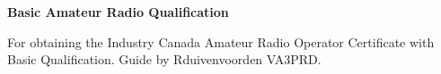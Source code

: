 \documentclass[12pt,letterpaper,fleqn,oneside]{article}
\begin{document}
\LARGE{\textbf{Basic Amateur Radio Qualification}}

\normalsize For obtaining the Industry Canada Amateur Radio Operator Certificate with Basic Qualification. Guide by Rduivenvoorden VA3PRD.

















\end{document}
